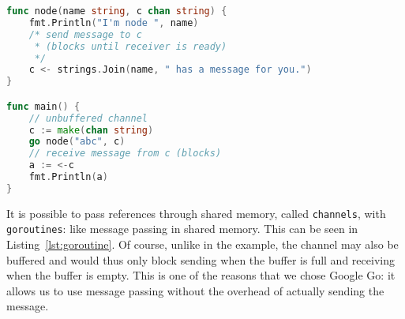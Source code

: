 \documentclass{acm_proc_article-sp}
\begin{document}
\begin{lstlisting}[caption=Small \texttt{goroutine} example with
\texttt{channels},language=Go,label=lst:goroutine]
func node(name string, c chan string) {
	fmt.Println("I'm node ", name)
	/* send message to c
	 * (blocks until receiver is ready)
	 */
	c <- strings.Join(name, " has a message for you.")
}

func main() {
	// unbuffered channel
	c := make(chan string)
	go node("abc", c)
	// receive message from c (blocks)
	a := <-c
	fmt.Println(a)
}
\end{lstlisting}

It is possible to pass references through shared memory, called
\texttt{channels}, with \texttt{goroutines}: like message passing in shared
memory. This can be seen in Listing~\ref{lst:goroutine}. Of course, unlike in
the example, the channel may also be buffered and would thus only block sending
when the buffer is full and receiving when the buffer is empty. This is one of
the reasons that we chose Google Go: it allows us to use message passing
without the overhead of actually sending the message.
\end{document}
